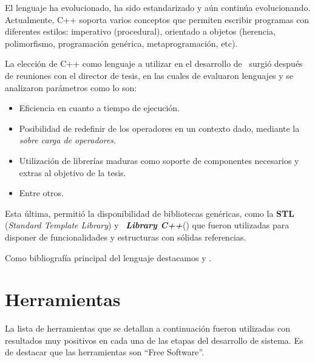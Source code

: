 El lenguaje ha evolucionado, ha sido estandarizado y aún continúa evolucionando. Actualmente, C++ soporta varios conceptos que permiten escribir programas con diferentes estilos: imperativo (procedural), orientado a objetos (herencia, polimorfismo, programación genérica, metaprogramación, etc).

La elección de C++ como lenguaje a utilizar en el desarrollo de \maggen\ surgió después de reuniones con el director de tesis, en las cuales de evaluaron lenguajes y se analizaron parámetros como lo son:

\begin{itemize}
\item Eficiencia en cuanto a tiempo de ejecución.

\item Posibilidad de redefinir de los operadores en un contexto dado, mediante la \textit{sobre carga de operadores}.

\item Utilización de librerías maduras como soporte de componentes necesarios y extras al objetivo de la tesis.

\item Entre otros.
\end{itemize}

Esta última, permitió la disponibilidad de bibliotecas genéricas, como la \textbf{STL} (\textit{Standard Template Library}) y \boost\ \textbf{\textit{Library C++}}(\cite{boost}) que fueron utilizadas para disponer de funcionalidades y estructuras con sólidas referencias.

Como bibliografía principal del lenguaje destacamos \cite{c++1} y \cite{c++2}.

\section{Herramientas}
\label{sec:metoherram}
La lista de herramientas que se detallan a continuación fueron utilizadas con resultados muy positivos en cada una de las etapas del desarrollo de sistema. Es de destacar que las herramientas son ``Free Software''.

